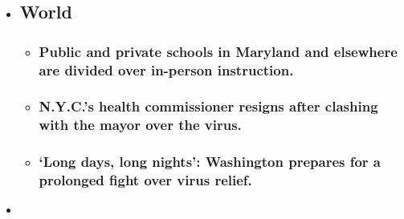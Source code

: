 \begin{itemize}
\item
  \href{https://www.nytimes3xbfgragh.onion/2020/08/04/world/coronavirus-cases.html?type=styln-live-updates\&label=world\&index=0}{}

  \hypertarget{world}{%
  \subsection{World}\label{world}}

  \begin{itemize}
  \item
    \href{https://www.nytimes3xbfgragh.onion/2020/08/04/world/coronavirus-cases.html?type=styln-live-updates\&label=world\&index=0\#link-4825b93}{}

    \hypertarget{public-and-private-schools-in-maryland-and-elsewhere-are-divided-over-in-person-instruction}{%
    \subsubsection{Public and private schools in Maryland and elsewhere
    are divided over in-person
    instruction.}\label{public-and-private-schools-in-maryland-and-elsewhere-are-divided-over-in-person-instruction}}
  \item
    \href{https://www.nytimes3xbfgragh.onion/2020/08/04/world/coronavirus-cases.html?type=styln-live-updates\&label=world\&index=0\#link-4d1eafa8}{}

    \hypertarget{nycs-health-commissioner-resigns-after-clashing-with-the-mayor-over-the-virus}{%
    \subsubsection{N.Y.C.'s health commissioner resigns after clashing
    with the mayor over the
    virus.}\label{nycs-health-commissioner-resigns-after-clashing-with-the-mayor-over-the-virus}}
  \item
    \href{https://www.nytimes3xbfgragh.onion/2020/08/04/world/coronavirus-cases.html?type=styln-live-updates\&label=world\&index=0\#link-6b644638}{}

    \hypertarget{long-days-long-nights-washington-prepares-for-a-prolonged-fight-over-virus-relief}{%
    \subsubsection{`Long days, long nights': Washington prepares for a
    prolonged fight over virus
    relief.}\label{long-days-long-nights-washington-prepares-for-a-prolonged-fight-over-virus-relief}}
  \end{itemize}
\item
  \href{https://www.nytimes3xbfgragh.onion/live/2020/08/04/business/stock-market-today-coronavirus?type=styln-live-updates\&label=business\&index=1}{}


\end{itemize}
